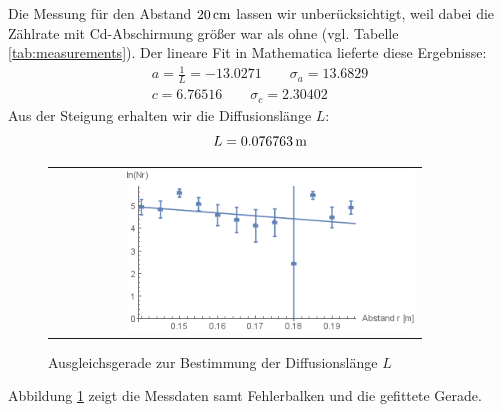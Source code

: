 \documentclass[a4paper,titlepage]{scrartcl}
\numberwithin{equation}{section}
\begin{document}
Die Messung für den Abstand $\unit[20]{cm}$ lassen wir unberücksichtigt, weil dabei die Zählrate mit Cd-Abschirmung größer war als ohne (vgl. Tabelle \ref{tab:measurements}).
Der lineare Fit in Mathematica lieferte diese Ergebnisse:
\begin{eqnarray*}
a=\frac{1}{L}=-13.0271 \quad \quad \sigma_a=13.6829\\
c=6.76516 \quad \quad \sigma_c=2.30402
\end{eqnarray*}
Aus der Steigung erhalten wir die Diffusionslänge $L$:
\begin{equation*}
L=\unit[0.076763]{m}
\end{equation*}
\begin{figure}[H]
	\centering
	\begin{tabular}{@{}r@{}}
		\includegraphics[width=0.8\textwidth]{diffusion.png}
	\end{tabular}
	\caption{Ausgleichsgerade zur Bestimmung der Diffusionslänge $L$}
    \label{fig:diffusionsGerade}
\end{figure}
Abbildung \ref{fig:diffusionsGerade} zeigt die Messdaten samt Fehlerbalken und die gefittete Gerade.
\end{document}

